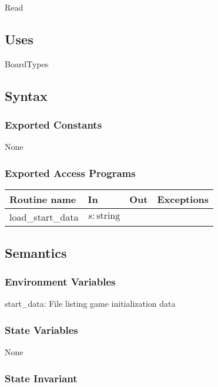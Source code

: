 \documentclass[12pt]{article}
\begin{document}
Read

\subsection* {Uses}

BoardTypes

\subsection* {Syntax}

\subsubsection* {Exported Constants}

None

\subsubsection* {Exported Access Programs}

\begin{tabular}{| l | l | l | l |}
\hline
\textbf{Routine name} & \textbf{In} & \textbf{Out} & \textbf{Exceptions}\\
\hline
load\_start\_data & $s: \mbox{string}$ & ~ & ~\\
\hline

\end{tabular}

\subsection* {Semantics}

\subsubsection* {Environment Variables}

start\_data: File listing game initialization data\\

\subsubsection* {State Variables}

None

\subsubsection* {State Invariant}
\end{document}

